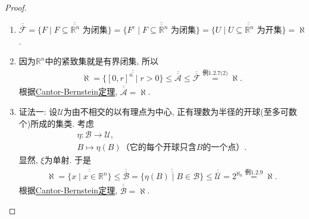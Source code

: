 \documentclass[../../main.tex]{subfiles}%
\begin{document}
\begin{proof}
\begin{enumerate}[(1)]
{\color{blue}证法三:}
设$\Gamma_k$为b边长为$\frac{1}{2^k}$的半开半闭正方体($k=0,1,2,\cdots$)的全体. 考虑
\begin{align*}
\theta: \mathscr{T}_{\rho_0^n} \to \bigcup_{k=0}^\infty \Gamma_k,
\end{align*}
$U \mapsto \theta(U)$为含于$U$中各$\Gamma_k(k=0,1,2,\cdots)$的半开半闭方体之集类, 它为单射. 于是
\begin{align*}
\aleph \stackrel{\text{\refthe{theorem:无穷多个集列的并的势}}}{=} \overline{\overline{\bigcup_{k=0}^\infty \Gamma_k}} \geqslant \overline{\overline{\mathscr{T}_{\rho_0^n}}} \geqslant \overline{\overline{\{B(\mathbf{0}; r)\mid r \in \mathbb{R}^+\}}} = \aleph.
\end{align*}
根据\hyperref[Set Theory-theorem:Cantor-Bernstein定理]{Cantor-Bernstein定理}, $\overline{\overline{\mathscr{T}_{\rho_0^n}}} = \aleph$.

\item $\overline{\overline{\mathscr{F}}}=\overline{\overline{\{F\mid F\subseteq \mathbb{R}^n\text{ 为闭集}\}}}=\overline{\overline{\{F^c\mid F\subseteq \mathbb{R}^n\text{ 为闭集}\}}}=\overline{\overline{\{U\mid U\subseteq \mathbb{R}^n\text{ 为开集}\}}}=\aleph$.

\item 因为$\mathbb{R}^n$中的紧致集就是有界闭集, 所以
\begin{align*}
\aleph = \overline{\overline{\{[0,r]^n\mid r > 0\}}} \leqslant \overline{\overline{\mathscr{A}}} \leqslant \overline{\overline{\mathscr{F}}} \stackrel{\text{例1.2.7(2)}}{=} \aleph.
\end{align*}
根据\hyperref[Set Theory-theorem:Cantor-Bernstein定理]{Cantor-Bernstein定理}, $\overline{\overline{\mathscr{A}}}=\aleph$.

\item {\color{blue}证法一:}
设$\mathscr{U}$为由不相交的以有理点为中心, 正有理数为半径的开球(至多可数个)所成的集类. 考虑
\begin{gather*}
\eta: \mathscr{B} \to \mathscr{U}, \\
B \mapsto \eta(B)\text{（它的每个开球只含}B\text{的一个点）}.
\end{gather*}
显然, $\xi$为单射. 于是
\begin{align*}
\aleph = \overline{\overline{\{x\mid x \in \mathbb{R}^n\}}} \leqslant \overline{\overline{\mathscr{B}}} = \overline{\overline{\{\eta(B)\mid B \in \mathscr{B}\}}} \leqslant \overline{\overline{\mathscr{U}}} = 2^{\aleph_0} \stackrel{\text{例1.2.9}}{=} \aleph.
\end{align*}
根据\hyperref[Set Theory-theorem:Cantor-Bernstein定理]{Cantor-Bernstein定理}, $\overline{\overline{\mathscr{B}}}=\aleph$.


\end{enumerate}
\end{proof}
\end{document}
